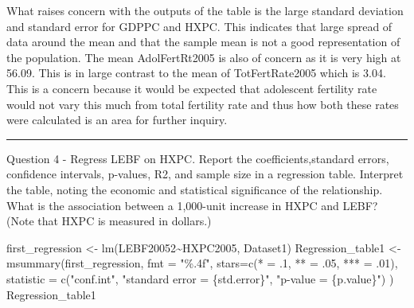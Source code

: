 \documentclass[
]{article}
\newenvironment{Shaded}{\begin{snugshade}}{\end{snugshade}}
\newcommand{\AttributeTok}[1]{\textcolor[rgb]{0.77,0.63,0.00}{#1}}
\newcommand{\DecValTok}[1]{\textcolor[rgb]{0.00,0.00,0.81}{#1}}
\newcommand{\FunctionTok}[1]{\textcolor[rgb]{0.00,0.00,0.00}{#1}}
\newcommand{\NormalTok}[1]{#1}
\newcommand{\OtherTok}[1]{\textcolor[rgb]{0.56,0.35,0.01}{#1}}
\newcommand{\SpecialCharTok}[1]{\textcolor[rgb]{0.00,0.00,0.00}{#1}}
\newcommand{\StringTok}[1]{\textcolor[rgb]{0.31,0.60,0.02}{#1}}
\begin{document}
What raises concern with the outputs of the table is the large standard
deviation and standard error for GDPPC and HXPC. This indicates that
large spread of data around the mean and that the sample mean is not a
good representation of the population. The mean AdolFertRt2005 is also
of concern as it is very high at 56.09. This is in large contrast to the
mean of TotFertRate2005 which is 3.04. This is a concern because it
would be expected that adolescent fertility rate would not vary this
much from total fertility rate and thus how both these rates were
calculated is an area for further inquiry.

\begin{center}\rule{0.5\linewidth}{0.5pt}\end{center}

Question 4 - Regress LEBF on HXPC. Report the coefficients,standard
errors, confidence intervals, p-values, R2, and sample size in a
regression table. Interpret the table, noting the economic and
statistical significance of the relationship. What is the association
between a 1,000-unit increase in HXPC and LEBF? (Note that HXPC is
measured in dollars.)

\begin{Shaded}
\begin{Highlighting}[]
\NormalTok{first\_regression }\OtherTok{\textless{}{-}} \FunctionTok{lm}\NormalTok{(LEBF20052}\SpecialCharTok{\textasciitilde{}}\NormalTok{HXPC2005, Dataset1)}
\NormalTok{Regression\_table1 }\OtherTok{\textless{}{-}} \FunctionTok{msummary}\NormalTok{(first\_regression, }\AttributeTok{fmt =} \StringTok{"\%.4f"}\NormalTok{,}
                              \AttributeTok{stars=}\FunctionTok{c}\NormalTok{(}\StringTok{\textquotesingle{}*\textquotesingle{}} \OtherTok{=}\NormalTok{ .}\DecValTok{1}\NormalTok{, }\StringTok{\textquotesingle{}**\textquotesingle{}} \OtherTok{=}\NormalTok{ .}\DecValTok{05}\NormalTok{, }\StringTok{\textquotesingle{}***\textquotesingle{}} \OtherTok{=}\NormalTok{ .}\DecValTok{01}\NormalTok{), }
                              \AttributeTok{statistic =} \FunctionTok{c}\NormalTok{(}\StringTok{"conf.int"}\NormalTok{,  }\StringTok{"standard error = \{std.error\}"}\NormalTok{, }
                                            \StringTok{"p{-}value = \{p.value\}"}\NormalTok{)}
\NormalTok{)         }
\NormalTok{Regression\_table1}
\end{Highlighting}
\end{Shaded}
\end{document}
